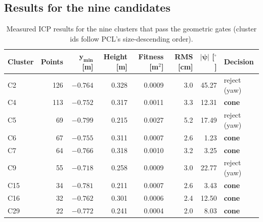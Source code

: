 \documentclass[10pt,a4paper]{scrartcl}
\begin{document}
  \subsection{Results for the nine candidates}

  \begin{table}[H]
  \small
  \centering
  \renewcommand{\arraystretch}{1.05}
  \begin{tabular}{@{}lrrrrrrl@{}}
  \toprule
  \textbf{Cluster} & \textbf{Points} & $\bm{y_{\min}}$ [m] & \textbf{Height} [m] & \textbf{Fitness} [m$^2$] & \textbf{RMS} [cm] & $|\bm\psi|$ [$^\circ$] & \textbf{Decision} \\
  \midrule
  C2  & 126 & $-0.764$ & 0.328 & 0.0009 & 3.0 & 45.27 & reject (yaw) \\
  C4  & 113 & $-0.752$ & 0.317 & 0.0011 & 3.3 & 12.31 & \textbf{cone} \\
  C5  &  69 & $-0.799$ & 0.215 & 0.0027 & 5.2 & 17.49 & reject (yaw) \\
  C6  &  67 & $-0.755$ & 0.311 & 0.0007 & 2.6 &  1.23 & \textbf{cone} \\
  C7  &  64 & $-0.766$ & 0.318 & 0.0010 & 3.2 &  3.25 & \textbf{cone} \\
  C9  &  55 & $-0.718$ & 0.258 & 0.0009 & 3.0 & 22.77 & reject (yaw) \\
  C15 &  34 & $-0.781$ & 0.211 & 0.0007 & 2.6 &  3.43 & \textbf{cone} \\
  C16 &  32 & $-0.762$ & 0.301 & 0.0006 & 2.4 & 12.50 & \textbf{cone} \\
  C29 &  22 & $-0.772$ & 0.241 & 0.0004 & 2.0 &  8.03 & \textbf{cone} \\
  \bottomrule
  \end{tabular}
  \caption{Measured ICP results for the nine clusters that pass the geometric gates
  (cluster ids follow PCL's size-descending order).}
  \label{tab:candidates}
  \end{table}
\end{document}
